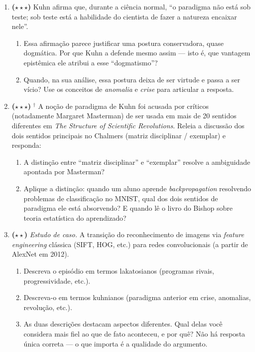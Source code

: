 \documentclass[10pt,a4paper]{extarticle}
\newcommand{\impt}[1]{\textcolor{important}{#1}}
\newcommand{\livro}{\textcolor{notice}{$^{\dagger}$}}
\newcommand{\difii}{$\star\star$}
\newcommand{\difiii}{$\star\star\star$}
\begin{document}
\begin{enumerate}[label=\textbf{\arabic*.}, leftmargin=*, start=11]
\item \textbf{(\difiii)} Kuhn afirma que, durante a \impt{ciência normal}, ``o paradigma não está sob teste; sob teste está a habilidade do cientista de fazer a natureza encaixar nele''.

\begin{enumerate}[label=(\alph*)]
    \item Essa afirmação parece justificar uma postura conservadora, quase dogmática. Por que Kuhn a defende mesmo assim --- isto é, que vantagem epistêmica ele atribui a esse ``dogmatismo''?
    \item Quando, na sua análise, essa postura deixa de ser virtude e passa a ser vício? Use os conceitos de \emph{anomalia} e \emph{crise} para articular a resposta.
\end{enumerate}

\item \textbf{(\difiii)} \livro{} A noção de \impt{paradigma} de Kuhn foi acusada por críticos (notadamente Margaret Masterman) de ser usada em mais de 20 sentidos diferentes em \emph{The Structure of Scientific Revolutions}. Releia a discussão dos dois sentidos principais no Chalmers (matriz disciplinar / exemplar) e responda:

\begin{enumerate}[label=(\alph*)]
    \item A distinção entre ``matriz disciplinar'' e ``exemplar'' resolve a ambiguidade apontada por Masterman?
    \item Aplique a distinção: quando um aluno aprende \emph{backpropagation} resolvendo problemas de classificação no MNIST, qual dos dois sentidos de paradigma ele está absorvendo? E quando lê o livro do Bishop sobre teoria estatística do aprendizado?
\end{enumerate}

\item \textbf{(\difii)} \emph{Estudo de caso.} A transição do reconhecimento de imagens via \emph{feature engineering} clássica (SIFT, HOG, etc.) para redes convolucionais (a partir de AlexNet em 2012).

\begin{enumerate}[label=(\alph*)]
    \item Descreva o episódio em termos \impt{lakatosianos} (programas rivais, progressividade, etc.).
    \item Descreva-o em termos \impt{kuhnianos} (paradigma anterior em crise, anomalias, revolução, etc.).
    \item As duas descrições destacam aspectos diferentes. Qual delas você considera mais fiel ao que de fato aconteceu, e por quê? Não há resposta única correta --- o que importa é a qualidade do argumento.
\end{enumerate}

\end{enumerate}
\end{document}
